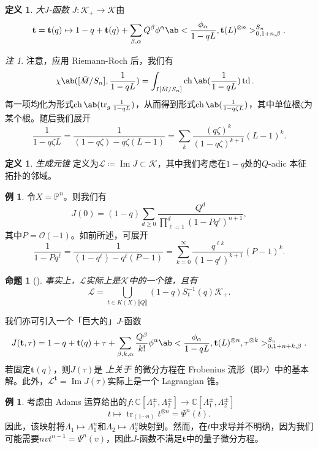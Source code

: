 \documentclass{amsart}
\newtheorem{prop}[thm]{命题}
\theoremstyle{definition}
\newtheorem{defn}[thm]{定义}
\newtheorem{exm}[thm]{例}
\theoremstyle{remark}
\newtheorem{rmk}[thm]{注}
\theoremstyle{plain}
\theoremstyle{definition}
\theoremstyle{remark}
\DeclareMathOperator{\Ima}{Im}
\newcommand{\C}{\mathbb{C}}
\renewcommand{\P}{\mathbb{P}}
\newcommand{\mc}[1]{\mathcal{#1}}
\newcommand{\on}[1]{\operatorname{#1}}
\newcommand{\1}{\mathbf{1}}
\newcommand{\2}{\mathbf{2}}
\newcommand{\3}{\mathbf{3}}
\newcommand{\ps}[1]{\llbracket #1 \rrbracket}
\begin{document}
\begin{defn}
    \textit{大\(J\)-函数} \(J \colon \mc{K}_+ \to \mc{K}\)由
    \[ \mathbf{t} = \mathbf{t}(q) \mapsto 1 - q + \mathbf{t}(q) + \sum_{\beta, \alpha} Q^{\beta} \phi^{\alpha} \ab< \frac{\phi_{\alpha}}{1-qL}, \mathbf{t}(L)^{\otimes n}>_{0, 1+n, \beta}^{S_n}. \]
\end{defn}

\begin{rmk}
注意，应用 Riemann-Roch 后，我们有
    \begin{align*}
        \chi\ab([\bar{M}/S_n], \frac{1}{1-qL}) &= \int_{I[\bar{M}/S_n]} \on{ch}\ab(\frac{1}{1-qL}) \on{td}.
    \end{align*}
每一项均化为形式\(\on{ch}\ab(\on{tr}_g \frac{1}{1-qL})\)，从而得到形式\(\on{ch}\ab(\frac{1}{1-q\zeta L})\)，其中单位根\(\zeta\)为某个根。随后我们展开
    \[ \frac{1}{1-q\zeta L} = \frac{1}{(1-q \zeta) - q\zeta (L-1)} = \sum_k \frac{(q\zeta)^k}{(1-q\zeta)^{k+1}}(L-1)^k. \]
\end{rmk}

\begin{defn}
\textit{ 生成元锥 } 定义为\(\mc{L} \coloneqq \Ima J \subset \mc{K}\)，其中我们考虑在\(1-q\)处的\(Q\)-adic 本征拓扑的邻域。
\end{defn}

\begin{exm}
令\(X = \P^n\)。则我们有
    \[ J(0) = (1-q) \sum_{d \geq 0} \frac{Q^d}{\prod_{\ell=1}^d (1-Pq^{\ell})^{n+1}}, \]
其中\(P = \mc{O}(-1)\)。如前所述，可展开
    \[ \frac{1}{1-P q^{\ell}} = \frac{1}{(1-q^{\ell}) - q^{\ell}(P-1)} = \sum_{k=0}^{\infty} \frac{q^{\ell k}}{(1-q^{\ell})^{k+1}}(P-1)^k. \]
\end{exm}

\begin{prop}[{\cite{GiventalK7}}]
事实上，\(\mc{L}\)实际上是\(\mc{K}\)中的一个锥，且有
    \[ \mc{L} = \bigcup_{t \in K(X)\ps{Q}} (1-q) S_{t}^{-1}(q) \mc{K}_+. \]
\end{prop}

我们亦可引入一个「巨大的」\(J\)-函数
\[ J(\mathbf{t}, \tau) = 1-q + \mathbf{t}(q) + \tau + \sum_{\beta, k, \alpha} \frac{Q^{\beta}}{k!} \phi^{\alpha} \ab< \frac{\phi_{\alpha}}{1-qL}, \mathbf{t}(L)^{\otimes n}, \tau^{\otimes k}>_{0,1+n+k,\beta}^{S_n}. \]
若固定\(\mathbf{t}(q)\)，则\(J(\tau)\)是 \textit{ 上关于 } 的微分方程在 Frobenius 流形（即\(\tau\)）中的基本解。此外，\(\mc{L}^{\mathbf{t}}=  \Ima J(\tau)\)实际上是一个 Lagrangian 锥。

\begin{exm}
考虑由 Adams 运算给出的\(f \colon \C[\Lambda_1^{\pm}, \Lambda_2^{\pm}] \to \C[\Lambda_1^{\pm}, \Lambda_2^{\pm}]\)
    \[ t \mapsto \on{tr}_{(1\cdots n)} t^{\otimes n} = \Psi^n (t). \]
因此，该映射将\(\Lambda_1 \mapsto \Lambda_1^n\)和\(\Lambda_2 \mapsto \Lambda_2^n\)映射到。然而，在\(t\)中求导并不明确，因为我们可能需要\(nv t^{n-1} = \Psi^n(v)\)，因此\(J\)-函数不满足\(\mathbf{t}\)中的量子微分方程。
\end{exm}
\end{document}
